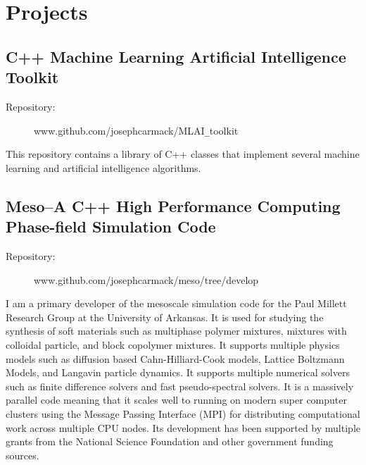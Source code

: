 \documentclass[10pt]{article}
\begin{document}
\section*{Projects}

\subsection{C++ Machine Learning Artificial Intelligence Toolkit}
\begin{description}
    \item[Repository:] www.github.com/josephcarmack/MLAI\texttt{\_}toolkit
\end{description}
This repository contains a library of C++ classes that implement several
machine learning and artificial intelligence algorithms.%

\subsection{Meso--A C++ High Performance Computing Phase-field Simulation Code}
\begin{description}
    \item[Repository:] www.github.com/josephcarmack/meso/tree/develop
\end{description}
I am a primary developer of the mesoscale simulation code for the Paul Millett
Research Group at the University of Arkansas. It is used for studying the
synthesis of soft materials such as multiphase polymer mixtures, mixtures with
colloidal particle, and block copolymer mixtures. It supports multiple physics
models such as diffusion based Cahn-Hilliard-Cook models, Lattice Boltzmann
Models, and Langavin particle dynamics. It supports multiple numerical solvers
such as finite difference solvers and fast pseudo-spectral solvers. It is a
massively parallel code meaning that it scales well to running on modern super
computer clusters using the Message Passing Interface (MPI) for distributing
computational work across multiple CPU nodes. Its development has been
supported by multiple grants from the National Science Foundation and other
government funding sources.
\end{document}
